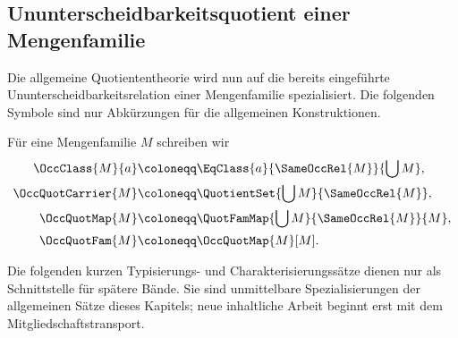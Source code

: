 \documentclass[main.tex]{subfiles}
\begin{document}
\subsection{Ununterscheidbarkeitsquotient einer Mengenfamilie}

Die allgemeine Quotiententheorie wird nun auf die bereits eingeführte
Ununterscheidbarkeitsrelation einer Mengenfamilie spezialisiert. Die folgenden
Symbole sind nur Abkürzungen für die allgemeinen Konstruktionen.

\begin{notation*}
Für eine Mengenfamilie \(M\) schreiben wir
\[
  \begin{aligned}
    \OccClass{M}{a}
      &\coloneqq \EqClass{a}{\SameOccRel{M}}{\bigcup M},\\
    \OccQuotCarrier{M}
      &\coloneqq \QuotientSet{\bigcup M}{\SameOccRel{M}},\\
    \OccQuotMap{M}
      &\coloneqq \QuotFamMap{\bigcup M}{\SameOccRel{M}}{M},\\
    \OccQuotFam{M}
      &\coloneqq \OccQuotMap{M}[M].
  \end{aligned}
\]
\end{notation*}

Die folgenden kurzen Typisierungs- und Charakterisierungssätze dienen nur als
Schnittstelle für spätere Bände. Sie sind unmittelbare Spezialisierungen der
allgemeinen Sätze dieses Kapitels; neue inhaltliche Arbeit beginnt erst mit dem
Mitgliedschaftstransport.

\begin{tabproof}
\end{tabproof}

\begin{tabproof}
\end{tabproof}
\end{document}
